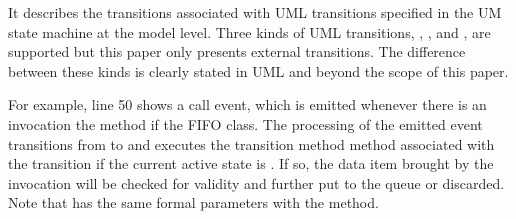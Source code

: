 

\noindent
{}
It describes the transitions associated with UML transitions specified in the UM state machine at the model level. 
Three kinds of UML transitions, , , and , are supported but this paper only presents external transitions.
The difference between these kinds is clearly stated in UML and beyond the scope of this paper.

For example, line 50 shows a call event, which is emitted whenever there is an invocation the  method if the FIFO class. 
The processing of the emitted event transitions from  to  and executes the  transition method method associated with the transition if the current active state is .
If so, the data item brought by the invocation will be checked for validity and further put to the queue or discarded.
Note that  has the same formal parameters with the  method.


